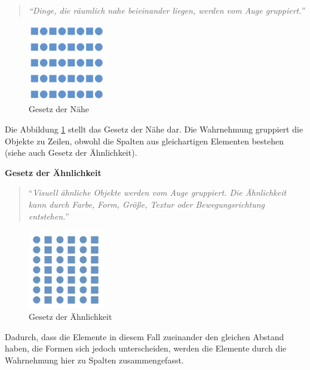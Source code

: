 \begin{quote}
\textit{\enquote{Dinge, die räumlich nahe beieinander liegen, werden vom Auge gruppiert.}}
\end{quote} \cite[S. 185]{Moser2012}

\begin{figure}[H]
 \centering
 \includegraphics[width=0.2999\textwidth]{grafiken/Gesetz_Naehe.png}
 \caption{Gesetz der Nähe \cite{Schossmann}}
 \label{fig:gesetz1}
\end{figure} 

Die Abbildung \ref{fig:gesetz1} stellt das Gesetz der Nähe dar. Die Wahrnehmung gruppiert die Objekte zu Zeilen, obwohl die Spalten aus gleichartigen Elementen bestehen (siehe auch Gesetz der Ähnlichkeit).

\textbf{Gesetz der Ähnlichkeit}

\begin{quote}
\enquote{\textit{Visuell ähnliche Objekte werden vom Auge gruppiert. Die Ähnlichkeit kann durch Farbe, Form, Größe, Textur oder Bewegungsrichtung entstehen.}}
\end{quote} \cite[S. 185]{Moser2012}

\begin{figure}[H]
 \centering
 \includegraphics[width=0.2999\textwidth]{grafiken/Gesetz_Aehnl.jpg}
 \caption{Gesetz der Ähnlichkeit \cite{Grigo}}
 \label{fig:gesetz2}
\end{figure} 

Dadurch, dass die Elemente in diesem Fall zueinander den gleichen Abstand haben, die Formen sich jedoch unterscheiden, werden die Elemente durch die Wahrnehmung hier zu Spalten zusammengefasst.
